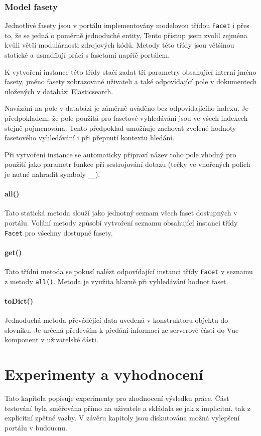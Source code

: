 \subsection{Model fasety}
Jednotlivé fasety jsou v portálu implementovány modelovou třídou \texttt{Facet} i přes to, že se jedná o poměrně jednoduché entity, Tento přístup jsem zvolil zejména kvůli větší modulárnosti zdrojových kódů. Metody této třídy jsou většinou statické a usnadňují práci s fasetami napříč portálem.

K vytvoření instance této třídy stačí zadat tři parametry obsahující interní jméno fasety, jméno fasety zobrazované uživateli a také odpovídající pole v dokumentech uložených v databázi Elasticsearch. 

Navázání na pole v databázi je záměrně uváděno bez odpovídajícího indexu. Je předpokladem, že pole použitá pro fasetové vyhledávání jsou ve všech indexech stejně pojmenována. Tento předpoklad umožňuje zachovat zvolené hodnoty fasetového vyhledávání i při přepnutí kontextu hledání. 

Při vytvoření instance se automaticky připraví název toho pole vhodný pro použití jako parametr funkce při sestrojování dotazu (tečky ve vnořených polích je nutné nahradit symboly \texttt{\_\_}). 

\subsubsection*{all()}
Tato statická metoda slouží jako jednotný seznam všech faset dostupných v portálu. Volání metody způsobí vytvoření seznamu obsahující instanci třídy \texttt{Facet} pro všechny dostupné fasety.

\subsubsection*{get()}
Tato třídní metoda se pokusí nalézt odpovídající instanci třídy \texttt{Facet} v seznamu z metody \texttt{all()}. Metoda je využita hlavně při vyhledávání hodnot faset.

\subsubsection*{toDict()}
Jednoduchá metoda převádějící data uvedená v konstruktoru objektu do slovníku. Je určená především k předání informací ze serverové části do Vue komponent v uživatelské části.



\chapter{Experimenty a vyhodnocení}
Tato kapitola popisuje experimenty pro zhodnocení výsledku práce. Část testování byla směřována přímo na uživatele a skládala se jak z implicitní, tak z explicitní zpětné vazby. V závěru kapitoly jsou diskutována možná vylepšení portálu v budoucnu.

